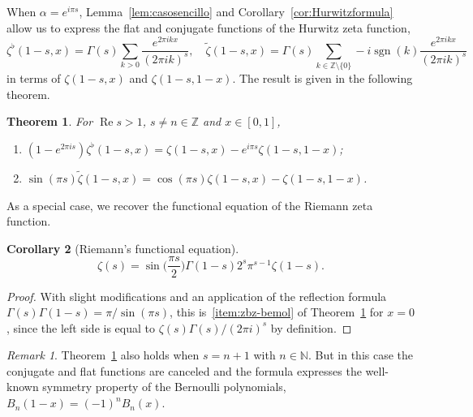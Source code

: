 \documentclass[11pt,a4paper,reqno]{amsart}
\newcommand{\N}{\mathbb{N}}
\newcommand{\Z}{\mathbb{Z}}
\let\tilde\widetilde
\renewcommand{\Re}{\operatorname{Re}}
\newcommand{\sgn}{\operatorname{sgn}}
\theoremstyle{plain}
\newtheorem{theorem}{Theorem}%
\newtheorem{cor}[theorem]{Corollary}
\theoremstyle{remark}
\newtheorem{remark}{Remark}
\numberwithin{equation}{section}
\begin{document}
When $\alpha=e^{i\pi s}$, Lemma~\ref{lem:casosencillo} and Corollary~\ref{cor:Hurwitzformula} allow us to express the  flat and conjugate functions of the Hurwitz zeta function,
\begin{equation*}
  \zeta^\flat(1-s,x)= \Gamma(s)\sum_{k>0}\frac{e^{2\pi ikx}}{(2\pi ik)^s},
  \quad
  \tilde{\zeta}(1-s,x) = \Gamma(s)\sum_{k\in\Z\setminus\{0\}}
  -i\sgn(k) \frac{e^{2\pi ikx}}{(2\pi ik)^s}
\end{equation*}
in terms of $\zeta(1-s,x)$ and $\zeta(1-s,1-x)$. The result is given in the following theorem.

\begin{theorem}
\label{theo:zbz}
For $\Re s>1$, $s\not=n\in\Z$ and $x\in [0,1]$,
\begin{enumerate}
  \item\label{item:zbz-bemol}
  $
    \displaystyle (1-e^{2\pi is}) \zeta^{\flat}(1-s,x)
  =  \zeta(1-s,x)-e^{i\pi s}\zeta(1-s,1-x)
  $;

  \item\label{item:zbz-conj}
  $
    \displaystyle \sin(\pi s) \tilde{\zeta}(1-s,x)
  = \cos(\pi s) \zeta(1-s,x) - \zeta(1-s,1-x)
  $.
\end{enumerate}
\end{theorem}

As a special case, we recover the functional equation of the Riemann zeta function.

\begin{cor}[Riemann's functional equation]
\label{cor:funceqZeta}	
\begin{equation*}
  \zeta(s) = \sin\Big(\frac{\pi s}{2}\Big) \Gamma(1-s)2^{s}\pi^{s-1}\zeta(1-s).
\end{equation*}
\end{cor}

\begin{proof}
With slight modifications and an application of the reflection formula $\Gamma(s)\Gamma(1-s) = \pi/\sin(\pi s)$, this is~\ref{item:zbz-bemol} of Theorem~\ref{theo:zbz} for $x=0$, since the left side is equal to $\zeta(s)\Gamma(s)/(2\pi i)^s$ by definition.
\end{proof}

\begin{remark}
Theorem~\ref{theo:zbz} also holds when $s=n+1$ with $n\in\N$. But in this case the conjugate and flat functions are canceled and the formula expresses the well-known symmetry property of the Bernoulli polynomials, $B_n(1-x) = (-1)^n B_n(x)$.
\end{remark}
\end{document}
